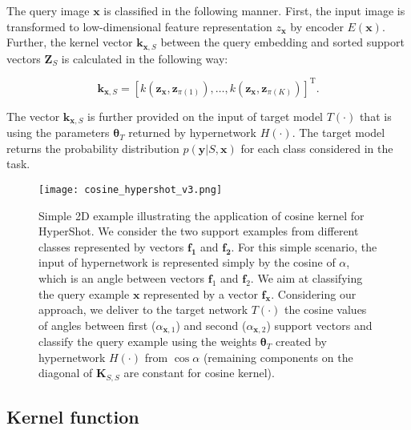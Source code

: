 \documentclass[nohyperref]{article}
\def\our{HyperShot}
\theoremstyle{plain}
\theoremstyle{definition}
\theoremstyle{remark}
\begin{document}
The query image $\mathbf{x}$ is classified in the following manner. First, the input image is transformed to low-dimensional feature representation $z_{\mathbf{x}}$ by encoder $E(\mathbf{x})$. Further, the kernel vector $\mathbf{k}_{\mathbf{x},S}$ between the query embedding and sorted support vectors $\mathbf{Z}_S$ is calculated in the following way:

\begin{equation}
\mathbf{k}_{\mathbf{x}, S} = [k(\mathbf{z}_{\mathbf{x}}, \mathbf{z}_{\pi (1)}),\dots,k(\mathbf{z}_{\mathbf{x}}, \mathbf{z}_{\pi (K)})]^{\mathrm{T}}.  
\end{equation}

The vector $\mathbf{k}_{\mathbf{x}, S}$ is further provided on the input of target model $T(\cdot)$ that is using the parameters $\boldsymbol \theta_{T}$ returned by hypernetwork $H(\cdot)$. The target model returns the probability distribution $p(\mathbf{y}|S, \mathbf{x})$ for each class considered in the task. 

\begin{figure}[t]
\begin{center}
    \centerline{\texttt{[image: cosine\_hypershot\_v3.png]}}
    \caption{Simple 2D example illustrating the application of cosine kernel for \our{}. We consider the two support examples from different classes represented by vectors $\mathbf{f_1}$ and $\mathbf{f_2}$. For this simple scenario, the input of hypernetwork is represented simply by the cosine of $\alpha$, which is an angle between vectors $\mathbf{f}_1$ and $\mathbf{f}_2$. We aim at classifying the query example $\mathbf{x}$ represented by a vector $\mathbf{f}_{\mathbf{x}}$. Considering our approach, we deliver to the target network $T(\cdot)$ the cosine values of angles between first ($\alpha_{\mathbf{x},1}$) and second ($\alpha_{\mathbf{x},2}$) support vectors and classify the query example using the weights $\boldsymbol{\theta}_{T}$ created by hypernetwork $H(\cdot)$ from $\cos{\alpha}$ (remaining components on the diagonal of $\mathbf{K}_{S,S}$ are constant for cosine kernel). }
    \label{fig:cosine}
    \end{center}
   \vskip -0.45in
\end{figure}



\subsection{Kernel function}
\end{document}
